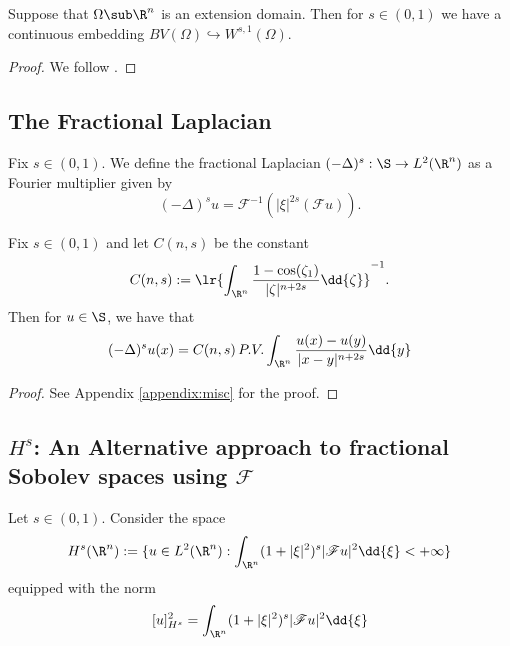 \documentclass[../main.tex]{subfiles}
\begin{document}
\begin{proposition}\label{BVinWs}
    Suppose that $ \Omega\sub \R^{n} $ is an extension domain. Then for $ s\in (0,1) $ we have a continuous embedding $ BV(\Omega)\hookrightarrow W^{s,1}(\Omega) $.
\end{proposition}

\begin{proof}
    We follow \textcite{lobardini:2019}. 
\end{proof}


\subsection{The Fractional Laplacian}

\begin{definition}
    Fix $ s\in (0,1) $. We define the fractional Laplacian $ (-\Delta)^{s}:\S\to L^{2}(\R^{n}) $ as a Fourier multiplier given by
    \[
        (-\Delta)^{s}u = \mathscr{F}^{-1} (| \xi|^{2s}( \mathscr{F}u)).
    \]
\end{definition}

\begin{proposition}\label{laplacianisintegral}
    Fix $ s\in (0,1) $ and let $ C(n,s) $ be the constant 
    \begin{equation}
        C(n,s) := \lr{ \int_{\R^{n}}\frac{1-\cos(\zeta_{1})}{| \zeta|^{n+2s}}\dd{\zeta}  }^{-1}.
    \end{equation}
    Then for $ u\in \S $, we have that 
    \begin{equation}
        (-\Delta )^{s}u(x) = C(n,s)\, P.V. \int_{\R^{n}} \frac{u(x) - u(y)}{|x-y|^{n+2s}} \dd{y}
    \end{equation}
\end{proposition}

\begin{proof}
    See Appendix \ref{appendix:misc} for the proof.
\end{proof}



\subsection{$ H^{s} $: An Alternative approach to fractional Sobolev spaces using $ \mathscr{F} $}

\begin{definition}
    Let $ s\in (0,1) $. Consider the space
    \[
         H^{s}(\R^{n}) := \{ u\in L^{2}(\R^{n}): \int_{\R^{n}}(1+| \xi|^{2})^{s}|\mathscr{F}u|^{2}\dd{\xi} < +\infty\} 
    \]
    equipped with the norm
    \[
        [u]_{H^{s}}^{2} = \int_{\R^{n}}(1+| \xi|^{2})^{s}|\mathscr{F}u|^{2}\dd{\xi} 
    \]
\end{definition}
\end{document}
